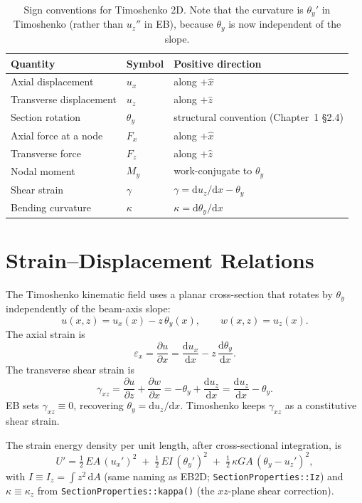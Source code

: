 \documentclass[11pt,a4paper]{article}
\newcommand{\dd}{\mathrm{d}}
\begin{document}
\begin{table}[h!]
\centering
\begin{tabular}{l l l}
\toprule
Quantity & Symbol & Positive direction \\
\midrule
Axial displacement       & $u_x$        & along $+\hat{x}$ \\
Transverse displacement  & $u_z$        & along $+\hat{z}$ \\
Section rotation         & $\theta_y$   & structural convention (Chapter~1 \S2.4) \\
Axial force at a node    & $F_x$        & along $+\hat{x}$ \\
Transverse force         & $F_z$        & along $+\hat{z}$ \\
Nodal moment             & $M_y$        & work-conjugate to $\theta_y$ \\
Shear strain             & $\gamma$     & $\gamma = \dd u_z/\dd x - \theta_y$ \\
Bending curvature        & $\kappa$     & $\kappa = \dd \theta_y / \dd x$ \\
\bottomrule
\end{tabular}
\caption{Sign conventions for Timoshenko 2D. Note that the curvature is $\theta_y'$ in Timoshenko (rather than $u_z''$ in EB), because $\theta_y$ is now independent of the slope.}
\end{table}

\section{Strain--Displacement Relations}

The Timoshenko kinematic field uses a planar cross-section that rotates by $\theta_y$ independently of the beam-axis slope:
\[
u(x, z) = u_x(x) - z\,\theta_y(x), \qquad w(x, z) = u_z(x).
\]
The axial strain is
\[
\varepsilon_x = \frac{\partial u}{\partial x} = \frac{\dd u_x}{\dd x} - z\,\frac{\dd \theta_y}{\dd x}.
\]
The transverse shear strain is
\[
\gamma_{xz} = \frac{\partial u}{\partial z} + \frac{\partial w}{\partial x} = -\theta_y + \frac{\dd u_z}{\dd x} = \frac{\dd u_z}{\dd x} - \theta_y.
\]
EB sets $\gamma_{xz} \equiv 0$, recovering $\theta_y = \dd u_z / \dd x$. Timoshenko keeps $\gamma_{xz}$ as a constitutive shear strain.

The strain energy density per unit length, after cross-sectional integration, is
\[
U' = \tfrac{1}{2}\,EA\,(u_x')^2 \;+\; \tfrac{1}{2}\,EI\,(\theta_y')^2 \;+\; \tfrac{1}{2}\,\kappa GA\,(\theta_y - u_z')^2,
\]
with $I \equiv I_z = \int z^2\,\dd A$ (same naming as EB2D; \texttt{SectionProperties::Iz}) and $\kappa \equiv \kappa_z$ from \texttt{SectionProperties::kappa()} (the $xz$-plane shear correction).
\end{document}
